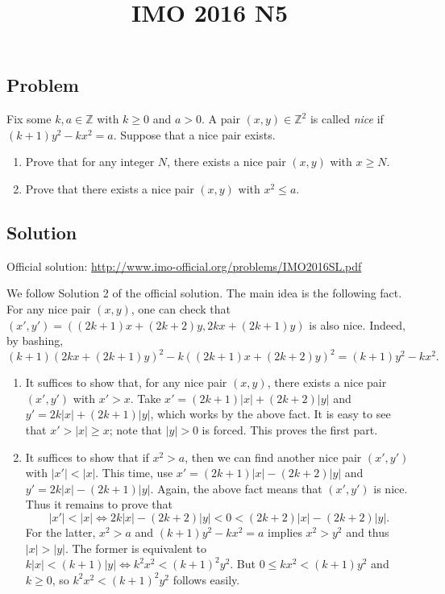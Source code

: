 \documentclass{article}
\title{IMO 2016 N5}
\author{}
\date{}
\newcommand{\Z}{\mathbb{Z}}
\begin{document}
\maketitle



\subsection*{Problem}

Fix some $k, a \in \Z$ with $k \geq 0$ and $a > 0$.
A pair $(x, y) \in \Z^2$ is called \emph{nice} if $(k + 1) y^2 - k x^2 = a$.
Suppose that a nice pair exists.

\begin{enumerate}
\item   Prove that for any integer $N$, there exists a nice pair $(x, y)$ with $x \geq N$.
\item   Prove that there exists a nice pair $(x, y)$ with $x^2 \leq a$.
\end{enumerate}



\subsection*{Solution}

Official solution: \url{http://www.imo-official.org/problems/IMO2016SL.pdf}

We follow Solution 2 of the official solution.
The main idea is the following fact.
For any nice pair $(x, y)$, one can check that $(x', y') = ((2k + 1) x + (2k + 2) y, 2k x + (2k + 1) y)$ is also nice.
Indeed, by bashing,
\[ (k + 1) (2k x + (2k + 1) y)^2 - k ((2k + 1) x + (2k + 2) y)^2 = (k + 1) y^2 - k x^2. \]

\begin{enumerate}

\item
It suffices to show that, for any nice pair $(x, y)$, there exists a nice pair $(x', y')$ with $x' > x$.
Take $x' = (2k + 1) |x| + (2k + 2) |y|$ and $y' = 2k |x| + (2k + 1) |y|$, which works by the above fact.
It is easy to see that $x' > |x| \geq x$; note that $|y| > 0$ is forced.
This proves the first part.

\item
It suffices to show that if $x^2 > a$, then we can find another nice pair $(x', y')$ with $|x'| < |x|$.
This time, use $x' = (2k + 1) |x| - (2k + 2) |y|$ and $y' = 2k |x| - (2k + 1) |y|$.
Again, the above fact means that $(x', y')$ is nice.
Thus it remains to prove that
\[ |x'| < |x| \iff 2k |x| - (2k + 2) |y| < 0 < (2k + 2) |x| - (2k + 2) |y|. \]
For the latter, $x^2 > a$ and $(k + 1) y^2 - k x^2 = a$ implies $x^2 > y^2$ and thus $|x| > |y|$.
The former is equivalent to $k|x| < (k + 1)|y| \iff k^2 x^2 < (k + 1)^2 y^2$.
But $0 \leq kx^2 < (k + 1) y^2$ and $k \geq 0$, so $k^2 x^2 < (k + 1)^2 y^2$ follows easily.

\end{enumerate}
\end{document}
